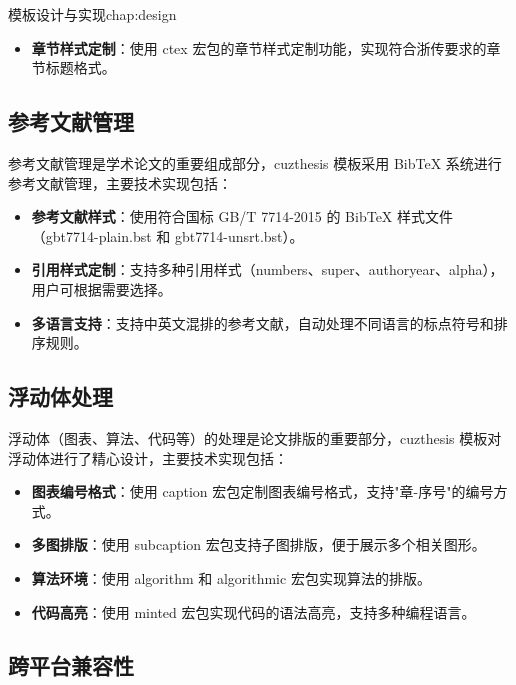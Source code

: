 \begin{cuzchapter}{模板设计与实现}{chap:design}
\begin{itemize}
        \item \textbf{章节样式定制}：使用 ctex 宏包的章节样式定制功能，实现符合浙传要求的章节标题格式。
    \end{itemize}

    \subsection{参考文献管理}

    参考文献管理是学术论文的重要组成部分，cuzthesis 模板采用 BibTeX 系统进行参考文献管理，主要技术实现包括：

    \begin{itemize}
        \item \textbf{参考文献样式}：使用符合国标 GB/T 7714-2015 的 BibTeX 样式文件（gbt7714-plain.bst 和 gbt7714-unsrt.bst）。

        \item \textbf{引用样式定制}：支持多种引用样式（numbers、super、authoryear、alpha），用户可根据需要选择。

        \item \textbf{多语言支持}：支持中英文混排的参考文献，自动处理不同语言的标点符号和排序规则。
    \end{itemize}

    \subsection{浮动体处理}

    浮动体（图表、算法、代码等）的处理是论文排版的重要部分，cuzthesis 模板对浮动体进行了精心设计，主要技术实现包括：

    \begin{itemize}
        \item \textbf{图表编号格式}：使用 caption 宏包定制图表编号格式，支持"章-序号"的编号方式。

        \item \textbf{多图排版}：使用 subcaption 宏包支持子图排版，便于展示多个相关图形。

        \item \textbf{算法环境}：使用 algorithm 和 algorithmic 宏包实现算法的排版。

        \item \textbf{代码高亮}：使用 minted 宏包实现代码的语法高亮，支持多种编程语言。
    \end{itemize}

    \subsection{跨平台兼容性}


\end{cuzchapter}
